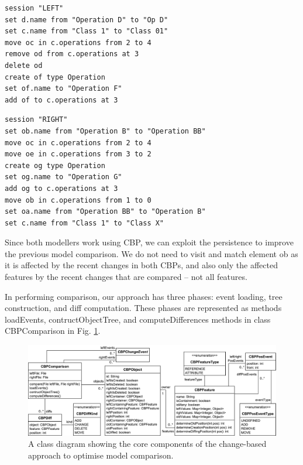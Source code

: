 \documentclass{llncs}
\begin{document}
\begin{minipage}[t]{0.49\linewidth}    
\begin{lstlisting}[firstnumber=19,style=eol,caption={The CBP of the model in Fig. \ref{fig:left} (left version).},label=lst:leftcbp]
session "LEFT"
set d.name from "Operation D" to "Op D"
set c.name from "Class 1" to "Class 01"
move oc in c.operations from 2 to 4
remove od from c.operations at 3
delete od
create of type Operation
set of.name to "Operation F"
add of to c.operations at 3
\end{lstlisting}
\end{minipage}
\hfill
\begin{minipage}[t]{0.49\linewidth}
\begin{lstlisting}[firstnumber=19,style=eol,caption={The CBP of the model in Fig. \ref{fig:right} (right version).},label=lst:rightcbp]
session "RIGHT"
set ob.name from "Operation B" to "Operation BB"
move oc in c.operations from 2 to 4
move oe in c.operations from 3 to 2
create og type Operation
set og.name to "Operation G" 
add og to c.operations at 3
move ob in c.operations from 1 to 0
set oa.name from "Operation BB" to "Operation B"
set c.name from "Class 1" to "Class X"
\end{lstlisting}
\end{minipage}

Since both modellers work using CBP, we can exploit the persistence to improve the previous model comparison. We do not need to visit and match element \textsf{ob} as it is affected by the recent changes in both CBPs, and also only the affected features by the recent changes that are compared -- not all features. 

In performing comparison, our approach has three phases: event loading, tree construction, and diff computation. These phases are represented as methods \textsf{loadEvents}, \textsf{contructObjectTree}, and \textsf{computeDifferences} methods in class \textsf{CBPComparison} in Fig. \ref{fig:approach_class_diagram}. 

\begin{figure}
    \includegraphics[width=\linewidth]{images/TreeClassDiagram}
    \caption{A class diagram showing the core components of the change-based approach to optimise model comparison.}
    \label{fig:approach_class_diagram}
\end{figure}
\end{document}
